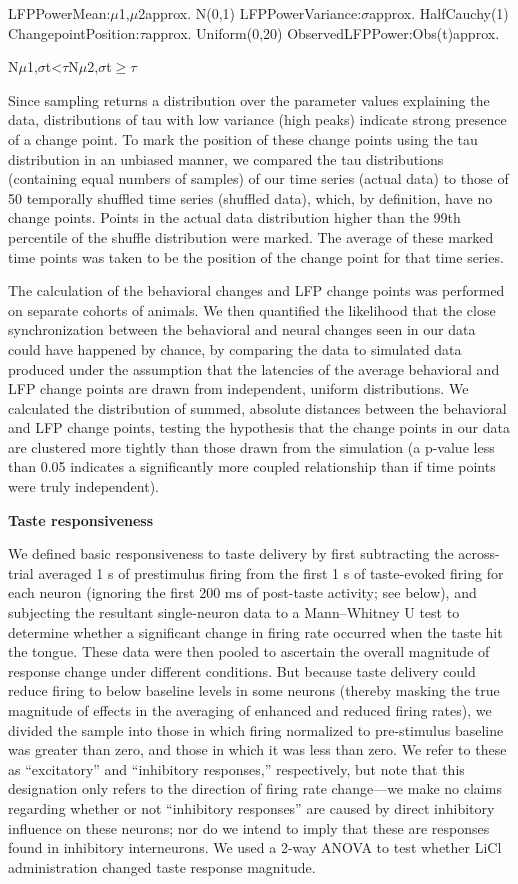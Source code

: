 \begin{refsection}
LFPPowerMean:\(\mu\)1,\(\mu\)2approx. N(0,1)
LFPPowerVariance:\(\sigma\)approx. HalfCauchy(1)
ChangepointPosition:\(\tau\)approx. Uniform(0,20)
ObservedLFPPower:Obs(t)approx. {N\(\mu\)1,\(\sigma\)t<\(\tau\)N\(\mu\)2,\(\sigma\)t\(\ge\)\(\tau\)

Since sampling returns a distribution over the parameter values explaining the data, distributions of tau with low variance (high peaks) indicate strong presence of a change point. To mark the position of these change points using the tau distribution in an unbiased manner, we compared the tau distributions (containing equal numbers of samples) of our time series (actual data) to those of 50 temporally shuffled time series (shuffled data), which, by definition, have no change points. Points in the actual data distribution higher than the 99th percentile of the shuffle distribution were marked. The average of these marked time points was taken to be the position of the change point for that time series.

The calculation of the behavioral changes and LFP change points was performed on separate cohorts of animals. We then quantified the likelihood that the close synchronization between the behavioral and neural changes seen in our data could have happened by chance, by comparing the data to simulated data produced under the assumption that the latencies of the average behavioral and LFP change points are drawn from independent, uniform distributions. We calculated the distribution of summed, absolute distances between the behavioral and LFP change points, testing the hypothesis that the change points in our data are clustered more tightly than those drawn from the simulation (a p-value less than 0.05 indicates a significantly more coupled relationship than if time points were truly independent).

\smallskip
\noindent\textbf{Taste responsiveness}\par
\noindent 
We defined basic responsiveness to taste delivery by first subtracting the across-trial averaged 1 s of prestimulus firing from the first 1 s of taste-evoked firing for each neuron (ignoring the first 200 ms of post-taste activity; see below), and subjecting the resultant single-neuron data to a Mann–Whitney U test to determine whether a significant change in firing rate occurred when the taste hit the tongue. These data were then pooled to ascertain the overall magnitude of response change under different conditions. But because taste delivery could reduce firing to below baseline levels in some neurons (thereby masking the true magnitude of effects in the averaging of enhanced and reduced firing rates), we divided the sample into those in which firing normalized to pre-stimulus baseline was greater than zero, and those in which it was less than zero. We refer to these as “excitatory” and “inhibitory responses,” respectively, but note that this designation only refers to the direction of firing rate change—we make no claims regarding whether or not “inhibitory responses” are caused by direct inhibitory influence on these neurons; nor do we intend to imply that these are responses found in inhibitory interneurons. We used a 2-way ANOVA to test whether LiCl administration changed taste response magnitude.

}
\end{refsection}
